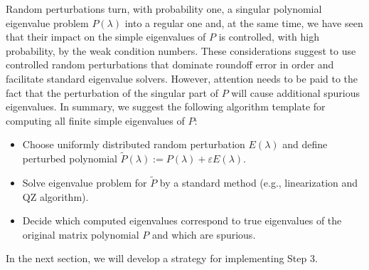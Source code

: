 \documentclass[12pt]{article}
\begin{document}
Random perturbations turn, with probability one, a singular polynomial eigenvalue problem $P(\lambda)$ into a regular one and, at the same time, we have seen that their impact on the simple eigenvalues of $P$ is controlled, with high probability, by the weak condition numbers. These considerations suggest to use controlled random perturbations that dominate roundoff error in order and facilitate standard eigenvalue solvers.
However, attention needs to be paid to the fact that the perturbation of the singular part of $P$ will cause additional spurious eigenvalues. In summary, we suggest the following algorithm template for computing all finite simple eigenvalues of $P$:
\begin{itemize}
    \item[1.] Choose uniformly distributed random perturbation $E(\lambda)$ and define perturbed polynomial $\tilde{P}(\lambda):=P(\lambda) + \varepsilon E(\lambda)$.
    \item[2.] Solve eigenvalue problem for $\tilde{P}$ by a standard method (e.g., linearization and QZ algorithm).
    \item[3.] Decide which computed eigenvalues correspond to true eigenvalues of the original matrix polynomial $P$ and which are spurious.
\end{itemize}
In the next section, we will develop a strategy for implementing Step 3.
\end{document}
